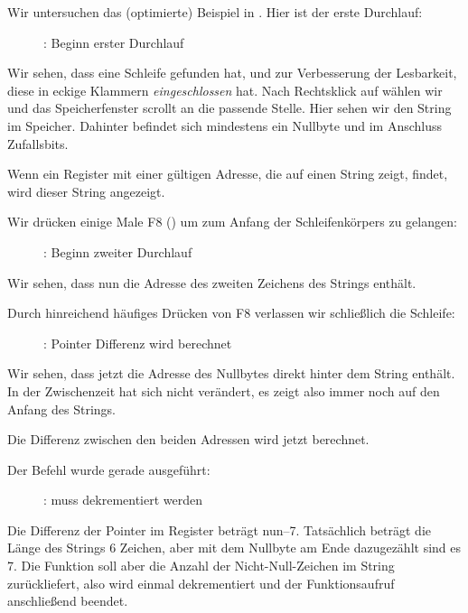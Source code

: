 \clearpage
{}
\myindex{\olly}

Wir untersuchen das (optimierte) Beispiel in \olly. Hier ist der erste
Durchlauf:

\begin{figure}[H]
\centering
{}
\caption{\olly: Beginn erster Durchlauf}
\label{fig:strlen_olly_1}
\end{figure}

Wir sehen, dass \olly eine Schleife gefunden hat, und zur Verbesserung der
Lesbarkeit, diese in eckige Klammern \emph{eingeschlossen} hat.
Nach Rechtsklick auf \EAX wählen wir  und das Speicherfenster
scrollt an die passende Stelle. 
Hier sehen wir den String  im Speicher. 
Dahinter befindet sich mindestens ein Nullbyte und im Anschluss Zufallsbits.

Wenn \olly ein Register mit einer gültigen Adresse, die auf einen String zeigt,
findet, wird dieser String angezeigt.

\clearpage
Wir drücken einige Male F8 (\stepover) um zum Anfang der Schleifenkörpers zu
gelangen:

\begin{figure}[H]
\centering
{}
\caption{\olly: Beginn zweiter Durchlauf}
\label{fig:strlen_olly_2}
\end{figure}

Wir sehen, dass \EAX nun die Adresse des zweiten Zeichens des Strings enthält.

\clearpage

Durch hinreichend häufiges Drücken von F8 verlassen wir schließlich die
Schleife:

\begin{figure}[H]
\centering
{}
\caption{\olly: Pointer Differenz wird berechnet}
\label{fig:strlen_olly_3}
\end{figure}

Wir sehen, dass \EAX jetzt die Adresse des Nullbytes direkt hinter dem String
enthält. In der Zwischenzeit hat sich \EDX nicht verändert, es zeigt also immer
noch auf den Anfang des Strings. 

Die Differenz zwischen den beiden Adressen wird jetzt berechnet. 

\clearpage
Der \SUB Befehl wurde gerade ausgeführt:

\begin{figure}[H]
\centering
{}
\caption{\olly: \EAX muss dekrementiert werden}
\label{fig:strlen_olly_4}
\end{figure}

Die Differenz der Pointer im \EAX Register beträgt nun--7.
Tatsächlich beträgt die Länge des  Strings 6 Zeichen, aber mit dem
Nullbyte am Ende dazugezählt sind es 7.
Die Funktion  soll aber die Anzahl der Nicht-Null-Zeichen im String
zurückliefert, also wird einmal dekrementiert und der Funktionsaufruf
anschließend beendet.
